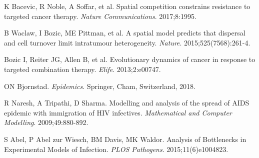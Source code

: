 \documentclass{article}
\begin{document}
\begin{thebibliography}{9}
K Bacevic, R Noble, A Soffar, et al. Spatial competition constrains resistance to targeted cancer therapy. \textit{Nature Communications}. 2017;8:1995.

B Waclaw, I Bozic, ME Pittman, et al. A spatial model predicts that dispersal and cell turnover limit intratumour heterogeneity. \textit{Nature}. 2015;525(7568):261-4.

Bozic I, Reiter JG, Allen B, et al. Evolutionary dynamics of cancer in response to targeted combination therapy. \textit{Elife}. 2013;2:e00747.

ON Bjornstad.
\textit{Epidemics}.
Springer, Cham, Switzerland, 2018.

R Naresh, A Tripathi, D Sharma. Modelling and analysis of the spread of AIDS epidemic with immigration of HIV infectives. \textit{Mathematical and Computer Modelling}. 2009;49:880-892.

S Abel, P Abel zur Wiesch, BM Davis, MK Waldor. Analysis of Bottlenecks in Experimental Models of Infection. \textit{PLOS Pathogens}. 2015;11(6)e1004823.

\end{thebibliography}
\end{document}

